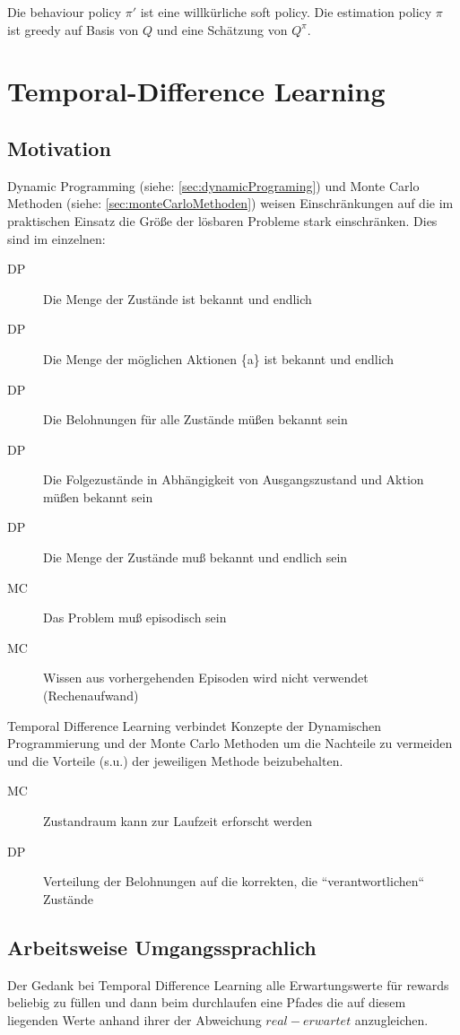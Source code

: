 \documentclass[10pt]{scrartcl}
\begin{document}
Die behaviour policy $\pi'$ ist eine willkürliche soft policy. Die estimation policy $\pi$ ist greedy auf Basis von $Q$ und eine Schätzung von $Q^{\pi}$.

\section{Temporal-Difference Learning}
	\subsection{Motivation}
	Dynamic Programming (siehe: \ref{sec:dynamicPrograming}) und Monte Carlo Methoden (siehe: \ref{sec:monteCarloMethoden}) weisen Einschränkungen auf die im praktischen Einsatz die Größe der lösbaren Probleme stark einschränken. Dies sind im einzelnen:
	\begin{description}
		\item[DP]{Die Menge der Zustände ist bekannt und endlich}
		\item[DP]{Die Menge der möglichen Aktionen \{a\} ist bekannt und endlich}
		\item[DP]{Die Belohnungen für alle Zustände müßen bekannt sein}
		\item[DP]{Die Folgezustände in Abhängigkeit von Ausgangszustand und Aktion müßen bekannt sein}
 		\item[DP]{Die Menge der Zustände muß bekannt und endlich sein}
		\item[MC]{Das Problem muß episodisch sein}
		\item[MC]{Wissen aus vorhergehenden Episoden wird nicht verwendet (Rechenaufwand)}
	\end{description}
	
	Temporal Difference Learning verbindet Konzepte der Dynamischen Programmierung und der Monte Carlo Methoden um die Nachteile zu vermeiden und die Vorteile (s.u.) der jeweiligen Methode beizubehalten.
	
	\begin{description}
		\item[MC] Zustandraum kann zur Laufzeit erforscht werden
		\item[DP] Verteilung der Belohnungen auf die korrekten, die ``verantwortlichen`` Zustände
	\end{description}


	\subsection{Arbeitsweise Umgangssprachlich}
	Der Gedank bei Temporal Difference Learning alle Erwartungswerte für rewards beliebig zu füllen und dann beim durchlaufen eine Pfades die auf diesem liegenden Werte anhand ihrer der Abweichung $real - erwartet$ anzugleichen.
\end{document}
